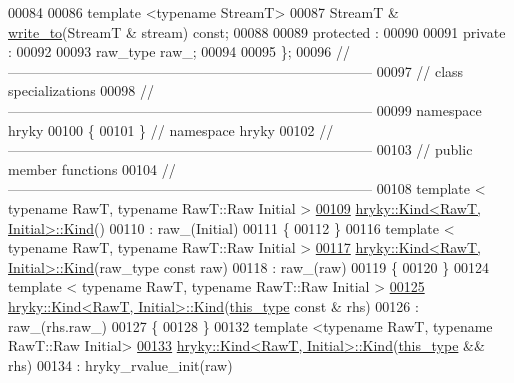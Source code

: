\begin{DoxyCode}
00084 
00086     \textcolor{keyword}{template} <\textcolor{keyword}{typename} StreamT>
00087     StreamT & \hyperlink{classhryky_1_1_kind_a1c070e6cf60cc110690142667089c3ff}{write_to}(StreamT & stream) \textcolor{keyword}{const};
00088 
00089 \textcolor{keyword}{protected} :
00090 
00091 \textcolor{keyword}{private} :
00092 
00093     raw\_type raw\_;
00094 
00095 \};
00096 \textcolor{comment}{//
      ------------------------------------------------------------------------------}
00097 \textcolor{comment}{// class specializations}
00098 \textcolor{comment}{//
      ------------------------------------------------------------------------------}
00099 \textcolor{keyword}{namespace }hryky
00100 \{
00101 \} \textcolor{comment}{// namespace hryky}
00102 \textcolor{comment}{//
      ------------------------------------------------------------------------------}
00103 \textcolor{comment}{// public member functions}
00104 \textcolor{comment}{//
      ------------------------------------------------------------------------------}
00108 \textcolor{comment}{}\textcolor{keyword}{template} < \textcolor{keyword}{typename} RawT, \textcolor{keyword}{typename} RawT::Raw Initial >
\hypertarget{kind_8h_source_l00109}{}\hyperlink{classhryky_1_1_kind_a7227a84a0d37701c73b1a0018885532d}{00109} \hyperlink{classhryky_1_1_kind_a7227a84a0d37701c73b1a0018885532d}{hryky::Kind<RawT, Initial>::Kind}()
00110     : raw\_(Initial)
00111 \{
00112 \}
00116 \textcolor{keyword}{template} < \textcolor{keyword}{typename} RawT, \textcolor{keyword}{typename} RawT::Raw Initial >
\hypertarget{kind_8h_source_l00117}{}\hyperlink{classhryky_1_1_kind_a6be5c110c872e8ec9ac98e2dcf4f38ab}{00117} \hyperlink{classhryky_1_1_kind}{hryky::Kind<RawT, Initial>::Kind}(raw\_type \textcolor{keyword}{const} raw)
00118     : raw\_(raw)
00119 \{
00120 \}
00124 \textcolor{keyword}{template} < \textcolor{keyword}{typename} RawT, \textcolor{keyword}{typename} RawT::Raw Initial >
\hypertarget{kind_8h_source_l00125}{}\hyperlink{classhryky_1_1_kind_a9bdba184a76801cc81c8e9625f7c54f7}{00125} \hyperlink{classhryky_1_1_kind}{hryky::Kind<RawT, Initial>::Kind}(\hyperlink{classhryky_1_1_kind}{this_type} \textcolor{keyword}{const} & rhs)
00126     : raw\_(rhs.raw\_)
00127 \{
00128 \}
00132 \textcolor{keyword}{template} <\textcolor{keyword}{typename} RawT, \textcolor{keyword}{typename} RawT::Raw Initial>
\hypertarget{kind_8h_source_l00133}{}\hyperlink{classhryky_1_1_kind_a663875668d2796e64096d23ab340cc15}{00133} \hyperlink{classhryky_1_1_kind}{hryky::Kind<RawT, Initial>::Kind}(\hyperlink{classhryky_1_1_kind}{this_type} && rhs)
00134     : hryky\_rvalue\_init(raw)

\end{DoxyCode}
